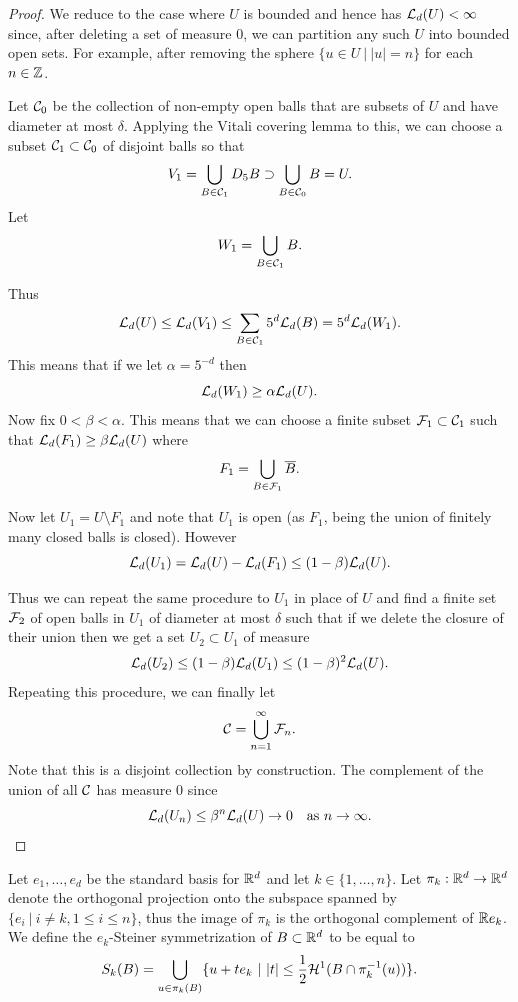 \documentclass[twoside, a4paper, 10pt]{amsart}
\begin{document}
\begin{proof} 

We reduce to the case where $U$ is bounded and hence has $\mathcal{L}_d(U) < \infty$ since, after deleting a set of measure $0$, we can partition any such $U$ into bounded open sets. For example, after removing the sphere $\{ u \in U ~|~ |u| = n \}$ for each $n \in \mathbb{Z}$.

Let $\mathcal{C}_0$ be the collection of non-empty open balls that are subsets of $U$ and have diameter at most $\delta$. Applying the Vitali covering lemma to this, we can choose a subset $\mathcal{C}_1 \subset \mathcal{C}_0$ of disjoint balls so that $$V_1 = \bigcup_{B \in \mathcal{C}_1} D_5 B \supset \bigcup_{B \in \mathcal{C}_0}B = U. $$ Let $$W_1 = \bigcup_{B \in \mathcal{C}_1} B.$$

Thus $$\mathcal{L}_d(U) \leq \mathcal{L}_d(V_1) \leq \sum_{B \in \mathcal{C}_1} 5^d\mathcal{L}_d(B) = 5^d \mathcal{L}_d(W_1).$$ This means that if we let $\alpha = 5^{-d}$ then $$\mathcal{L}_d(W_1) \geq \alpha \mathcal{L}_d(U).$$ Now fix $0< \beta < \alpha$. This means that we can choose a finite subset $\mathcal{F}_1 \subset \mathcal{C}_1$ such that $\mathcal{L}_d(F_1) \geq \beta \mathcal{L}_d(U)$ where $$F_1 = \bigcup_{B \in \mathcal{F}_1} \overline{B}.$$

Now let $U_1 = U \setminus F_1$ and note that $U_1$ is open (as $F_1$, being the union of finitely many closed balls is closed). However $$\mathcal{L}_d(U_1) = \mathcal{L}_d(U) - \mathcal{L}_d(F_1) \leq (1 - \beta) \mathcal{L}_d(U).$$  

Thus we can repeat the same procedure to $U_1$ in place of $U$ and find a finite set $\mathcal{F}_2$ of open balls in $U_1$ of diameter at most $\delta$ such that if we delete the closure of their union then we get a set $U_2 \subset U_1$ of measure $$\mathcal{L}_d(U_2) \leq (1 - \beta) \mathcal{L}_d(U_1) \leq (1-\beta)^2 \mathcal{L}_d(U).$$ Repeating this procedure, we can finally let $$\mathcal{C} = \bigcup_{n=1}^{\infty} \mathcal{F}_n.$$ Note that this is a disjoint collection by construction. The complement of the union of all $\mathcal{C}$ has measure $0$ since $$\mathcal{L}_d(U_n) \leq \beta ^n \mathcal{L}_d(U) \to 0 \quad\text{as } n \to \infty.$$
\end{proof}

\begin{mydef} Let $e_1, \ldots, e_d$ be the standard basis for $\mathbb{R}^d$ and let $k \in \{1, \ldots, n\}$. Let $\pi_k:\mathbb{R}^d \to \mathbb{R}^d$ denote the orthogonal projection onto the subspace spanned by $\{e_i ~|~ i \neq k, 1 \leq i \leq n \}$, thus the image of $\pi_k$ is the orthogonal complement of $\mathbb{R} e_k$. We define the $e_k$-Steiner symmetrization of $B \subset \mathbb{R}^d$ to be equal to $$S_k(B) = \bigcup_{u \in \pi_k(B)}\{ u + te_k ~|~ |t| \leq \frac{1}{2} \mathcal{H}^{1}(B \cap \pi_k^{-1}(u)) \}.$$

\end{mydef}
\end{document}

